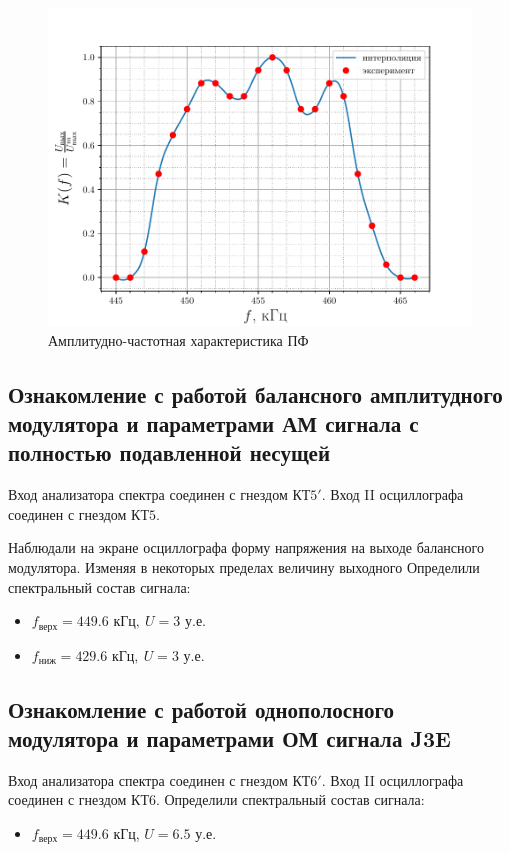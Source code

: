 \begin{figure}[H]
	\centering
	\includegraphics[width=0.7\linewidth]{fig/task1}
	\caption{Амплитудно-частотная характеристика ПФ}
	\label{fig:rec1}
\end{figure}


\subsection{Ознакомление с работой балансного амплитудного модулятора и параметрами АМ сигнала с полностью подавленной несущей}

Вход анализатора спектра соединен с гнездом $\text{КТ}5'$. Вход II осциллографа соединен с гнездом $\text{КТ}5$.

Наблюдали на экране осциллографа форму напряжения на выходе
балансного модулятора. Изменяя в некоторых пределах величину выходного
Определили спектральный состав сигнала:
\begin{itemize}
	\item $f_{\text{верх}}=449.6 \text{ кГц}, ~ U= 3 \text{ у.е.} $
	\item $f_{\text{ниж}}=429.6 \text{ кГц}, ~ U= 3 \text{ у.е.} $
\end{itemize}



\subsection{Ознакомление с работой однополосного модулятора и параметрами ОМ сигнала J3E}
Вход анализатора спектра соединен с гнездом $\text{КТ}6'$. Вход II осциллографа соединен с гнездом $\text{КТ}6$.
Определили спектральный состав сигнала:
\begin{itemize}
	\item $f_{\text{верх}}=449.6$ кГц, $U=6.5$ у.е.
\end{itemize}

